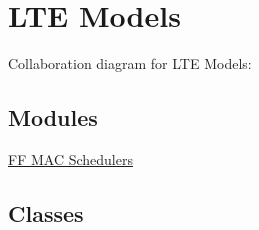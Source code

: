 \hypertarget{group__lte}{}\section{L\+TE Models}
\label{group__lte}
Collaboration diagram for L\+TE Models\+:
\subsection*{Modules}
\begin{DoxyCompactItemize}
\item 
\hyperlink{group__ff-api}{F\+F M\+A\+C Schedulers}
\end{DoxyCompactItemize}
\subsection*{Classes}
